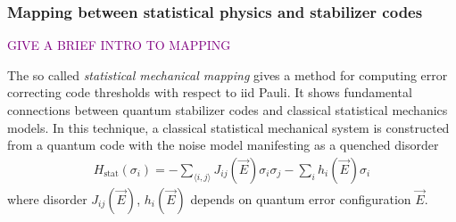 \documentclass[ a4paper, 
                amsfonts, 
                amssymb, 
                amsmath, 
                reprint, 
                showkeys, 
                nofootinbib,
                superscriptaddress, 
                onecolumn, 
                notitlepage,
                aps,
                pra,
                longbibliography]{revtex4-1}
\newcommand{\tom}[1]{\textcolor{purple}{#1}}
\theoremstyle{definition}
\begin{document}







\subsubsection{Mapping between statistical physics and stabilizer codes}

\tom{GIVE A BRIEF INTRO TO MAPPING}

The so called \textit{statistical mechanical mapping} \cite{Dennis_2002} gives a method for computing error correcting code
thresholds with respect to iid Pauli. It shows fundamental connections between quantum stabilizer codes and classical statistical mechanics models. In this technique, a classical statistical mechanical system is constructed from
a quantum code with the noise model manifesting as a
quenched disorder
\begin{align}
H_{\text{stat}}(\sigma_i) = -\sum_{\langle i,j \rangle} J_{ij}(\vec{E})\sigma_i\sigma_j - \sum_i h_i(\vec{E})\sigma_i
\end{align}
where disorder $J_{ij}(\vec{E})$, $h_i(\vec{E})$ depends on quantum error configuration $\vec{E}$.
\end{document}
